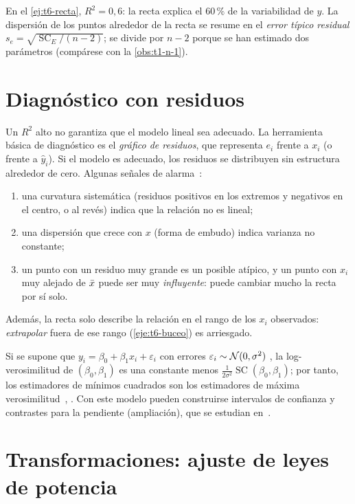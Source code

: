 En el \cref{ej:t6-recta}, $R^{2}=0{,}6$: la recta explica el $60\,\%$ de la variabilidad de $y$. La dispersión de los puntos alrededor de la recta se resume en el \emph{error típico residual} $s_e=\sqrt{\operatorname{SC}_E/(n-2)}$; se divide por $n-2$ porque se han estimado dos parámetros (compárese con la \cref{obs:t1-n-1}).

\section{Diagnóstico con residuos}

Un $R^{2}$ alto no garantiza que el modelo lineal sea adecuado. La herramienta básica de diagnóstico es el \emph{gráfico de residuos}, que representa $e_i$ frente a $x_i$ (o frente a $\widehat y_i$). Si el modelo es adecuado, los residuos se distribuyen sin estructura alrededor de cero. Algunas señales de alarma~\cite[§12.3]{openstax}:
\begin{enumerate}
  \item una curvatura sistemática (residuos positivos en los extremos y negativos en el centro, o al revés) indica que la relación no es lineal;
  \item una dispersión que crece con $x$ (forma de embudo) indica varianza no constante;
  \item un punto con un residuo muy grande es un posible atípico, y un punto con $x_i$ muy alejado de $\bar{x}$ puede ser muy \emph{influyente}: puede cambiar mucho la recta por sí solo.
\end{enumerate}
Además, la recta solo describe la relación en el rango de los $x_i$ observados: \emph{extrapolar} fuera de ese rango (\cref{eje:t6-buceo}) es arriesgado.

\begin{observacion}\label{obs:t6-modelo}
Si se supone que $y_i=\beta_0+\beta_1x_i+\varepsilon_i$ con errores $\varepsilon_i\sim\mathcal{N}(0,\sigma^{2})$ \iid, la log-verosimilitud de $(\beta_0,\beta_1)$ es una constante menos $\frac{1}{2\sigma^{2}}\operatorname{SC}(\beta_0,\beta_1)$; por tanto, los estimadores de mínimos cuadrados son los estimadores de máxima verosimilitud~\cite[cap.~13]{wasserman}, \cite[\emph{problem set}~6]{mit1805}. Con este modelo pueden construirse intervalos de confianza y contrastes para la pendiente (ampliación), que se estudian en~\cite[cap.~14]{rice}.
\end{observacion}

\section{Transformaciones: ajuste de leyes de potencia}

